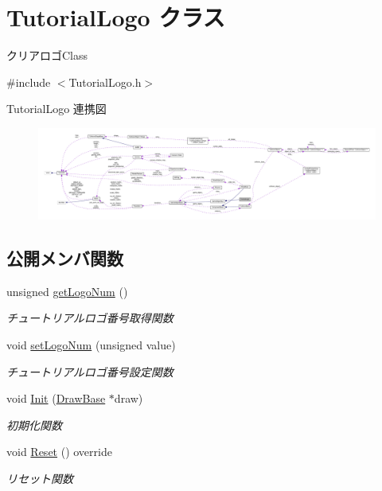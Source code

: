 \hypertarget{class_tutorial_logo}{}\section{Tutorial\+Logo クラス}
\label{class_tutorial_logo}


クリアロゴ\+Class  




{\ttfamily \#include $<$Tutorial\+Logo.\+h$>$}



Tutorial\+Logo 連携図\nopagebreak
\begin{figure}[H]
\begin{center}
\leavevmode
\includegraphics[width=350pt]{class_tutorial_logo__coll__graph}
\end{center}
\end{figure}
\subsection*{公開メンバ関数}
\begin{DoxyCompactItemize}
\item 
unsigned \mbox{\hyperlink{class_tutorial_logo_ada533e278273685d3de1a29742a6b7f0}{get\+Logo\+Num}} ()
\begin{DoxyCompactList}\small\item\em チュートリアルロゴ番号取得関数 \end{DoxyCompactList}\item 
void \mbox{\hyperlink{class_tutorial_logo_a6f21283935bf1deed19fec1412eabd72}{set\+Logo\+Num}} (unsigned value)
\begin{DoxyCompactList}\small\item\em チュートリアルロゴ番号設定関数 \end{DoxyCompactList}\item 
void \mbox{\hyperlink{class_tutorial_logo_a590f017a6b0532d08c1377b90b8fba3f}{Init}} (\mbox{\hyperlink{class_draw_base}{Draw\+Base}} $\ast$draw)
\begin{DoxyCompactList}\small\item\em 初期化関数 \end{DoxyCompactList}\item 
void \mbox{\hyperlink{class_tutorial_logo_a2c9e22c81cfeafbd34f50cc766a66cf1}{Reset}} () override
\begin{DoxyCompactList}\small\item\em リセット関数 \end{DoxyCompactList}\end{DoxyCompactItemize}
